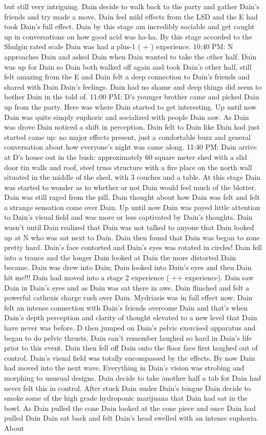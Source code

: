 \documentclass[12pt]{book}
\begin{document}
but still very intriguing. Dain decide to walk back to the party and gather Dain's friends and try made a move. Dain feel mild effects from the LSD and the E had took Dain's full effect. Dain by this stage am incredibly sociable and get caught up in conversations on how good acid was ha-ha. By this stage accorded to the Shulgin rated scale Dain was had a plus-1 ( + ) experience. 10:40 PM: N approaches Dain and asked Dain when Dain wanted to take the other half. Dain was up for Dain so Dain both walked off again and took Dain's other half, still felt amazing from the E and Dain felt a deep connection to Dain's friends and shared with Dain Dain's feelings. Dain had no shame and deep things did seem to bother Dain in the told of. 11:00 PM: D's younger brother came and picked Dain up from the party. Here was where Dain started to get interesting. Up until now Dain was quite simply euphoric and socialized with people Dain saw. As Dain was drove Dain noticed a shift in perception. Dain felt to Dain like Dain had just started came up: no major effects present, just a comfortable buzz and general conversation about how everyone's night was came along. 11:40 PM: Dain arrive at D's house out in the bush: approximately 60 square meter shed with a slid door tin walls and roof, steel truss structure with a fire place on the north wall situated in the middle of the shed, with 3 couches and a table. At this stage Dain was started to wonder as to whether or not Dain would feel much of the blotter. Dain was still raged from the pill. Dain thought about how Dain was felt and felt a strange sensation come over Dain. Up until now Dain was payed little attention to Dain's visual field and was more or less captivated by Dain's thoughts. Dain wasn't until Dain realized that Dain was not talked to anyone that Dain looked up at N who was sat next to Dain. Dain then found that Dain was began to zone pretty hard. Dain's face contorted and Dain's eyes was rotated in circles! Dain fell into a trance and the longer Dain looked at Dain the more distorted Dain became. Dain was drew into Dain; Dain looked into Dain's eyes and then Dain hit me!!! Dain had moved into a stage 2 experience ( ++ experience). Dain saw Dain in Dain's eyes and as Dain was sat there in awe. Dain flinched and felt a powerful cathexis charge rush over Dain. Mydriasis was in full effect now. Dain felt an intense connection with Dain's friends overcome Dain and that's when Dain's depth perception and clarity of thought elevated to a new level that Dain have never was before. D then jumped on Dain's pelvic exercised apparatus and began to do pelvic thrusts. Dain can't remember laughed so hard in Dain's life prior to this event. Dain then fell off Dain onto the floor face first laughed out of control. Dain's visual field was totally encompassed by the effects. By now Dain had moved into the next wave. Everything in Dain's vision was strobing and morphing to unusual designs. Dain decide to take another half a tab for Dain had never felt this in control. After stuck Dain under Dain's tongue Dain decide to smoke some of the high grade hydroponic marijuana that Dain had sat in the bowl. As Dain pulled the cone Dain looked at the cone piece and once Dain had pulled Dain Dain sat back and felt Dain's head swelled with an intense euphoria. About 
\end{document}
